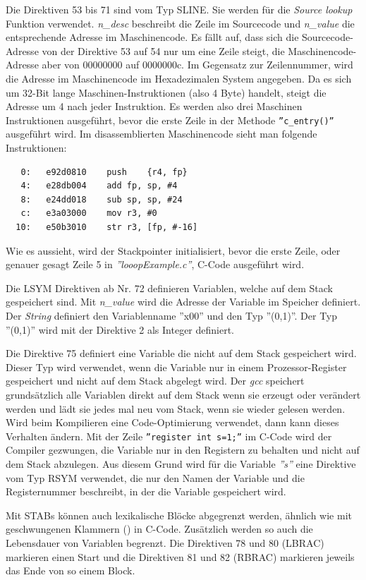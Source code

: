 Die Direktiven 53 bis 71 sind vom Typ SLINE.
Sie werden für die \textit{Source lookup} Funktion verwendet.
\textit{n\_desc} beschreibt die Zeile im Sourcecode und \textit{n\_value} die entsprechende Adresse im Maschinencode.
Es fällt auf, dass sich die Sourcecode-Adresse von der Direktive 53 auf 54 nur um eine Zeile steigt, die Maschinencode-Adresse aber von 00000000 auf 0000000c.
Im Gegensatz zur Zeilennummer, wird die Adresse im Maschinencode im Hexadezimalen System angegeben.
Da es sich um 32-Bit lange Maschinen-Instruktionen (also 4 Byte) handelt, steigt die Adresse um 4 nach jeder Instruktion.
Es werden also drei Maschinen Instruktionen ausgeführt, bevor die erste Zeile in der Methode \texttt{''c\_entry()''} ausgeführt wird.
Im disassemblierten Maschinencode sieht man folgende Instruktionen:
\lstset{language=plain}
\begin{lstlisting}
   0:	e92d0810 	push	{r4, fp}
   4:	e28db004 	add	fp, sp, #4
   8:	e24dd018 	sub	sp, sp, #24
   c:	e3a03000 	mov	r3, #0
  10:	e50b3010 	str	r3, [fp, #-16]
\end{lstlisting}

Wie es aussieht, wird der Stackpointer initialisiert, bevor die erste Zeile, oder genauer gesagt Zeile 5 in \textit{''looopExample.c''}, C-Code ausgeführt wird.

Die LSYM Direktiven ab Nr. 72 definieren Variablen, welche auf dem Stack gespeichert sind.
Mit \textit{n\_value} wird die Adresse der Variable im Speicher definiert.
Der \textit{String} definiert den Variablenname ''x00'' und den Typ ''(0,1)''.
Der Typ ''(0,1)'' wird mit der Direktive 2 als Integer definiert.

Die Direktive 75 definiert eine Variable die nicht auf dem Stack gespeichert wird.
Dieser Typ wird verwendet, wenn die Variable nur in einem Prozessor-Register gespeichert und nicht auf dem Stack abgelegt wird.
Der \textit{gcc} speichert grundsätzlich alle Variablen direkt auf dem Stack wenn sie erzeugt oder verändert werden und lädt sie jedes mal neu vom Stack, wenn sie wieder gelesen werden.
Wird beim Kompilieren eine Code-Optimierung verwendet, dann kann dieses Verhalten ändern.
Mit der Zeile \texttt{{''register int s=1;''}} im C-Code wird der Compiler gezwungen, die Variable nur in den Registern zu behalten und nicht auf dem Stack abzulegen.
Aus diesem Grund wird für die Variable \textit{''s''} eine Direktive vom Typ RSYM verwendet, die nur den Namen der Variable und die Registernummer beschreibt, in der die Variable gespeichert wird.

Mit STABs können auch lexikalische Blöcke abgegrenzt werden, ähnlich wie mit geschwungenen Klammern ({}) in C-Code.
Zusätzlich werden so auch die Lebensdauer von Variablen begrenzt.
Die Direktiven 78 und 80 (LBRAC) markieren einen Start und die Direktiven 81 und 82 (RBRAC) markieren jeweils das Ende von so einem Block.


